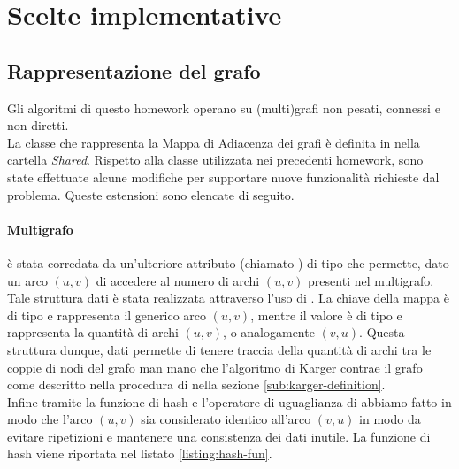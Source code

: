 \section{Scelte implementative}
\label{cap:implementation-choices}

\subsection{Rappresentazione del grafo}
\label{sub:graph-representation}

Gli algoritmi di questo homework operano su (multi)grafi non pesati,
connessi e non diretti.\\


\noindent La classe che rappresenta la Mappa di Adiacenza dei grafi è
definita in  nella cartella
\textit{Shared}. Rispetto alla classe utilizzata nei precedenti
homework, sono state effettuate alcune modifiche per supportare nuove
funzionalità richieste dal problema. Queste estensioni sono elencate
di seguito.

\paragraph{Multigrafo}
 è stata corredata da un'ulteriore
attributo (chiamato ) di tipo
 che permette, dato un arco $(u,v)$ di
accedere al numero di archi $(u,v)$ presenti nel multigrafo. Tale
struttura dati è stata realizzata attraverso l'uso di
. La chiave della mappa è di tipo
 e rappresenta il generico arco $(u,v)$, mentre il
valore è di tipo  e rappresenta la quantità di
archi $(u,v)$, o analogamente $(v,u)$. Questa struttura dunque, dati
permette di tenere traccia della quantità di archi tra le coppie di
nodi del grafo man mano che l'algoritmo di Karger contrae il grafo
come descritto nella procedura di  nella
sezione \ref{sub:karger-definition}.\\

\noindent Infine tramite la funzione di hash e l'operatore di
uguaglianza di  abbiamo fatto in modo che l'arco $(u,v)$
sia considerato identico all'arco $(v,u)$ in modo da evitare
ripetizioni e mantenere una consistenza dei dati inutile. La funzione
di hash viene riportata nel listato \ref{listing:hash-fun}.

